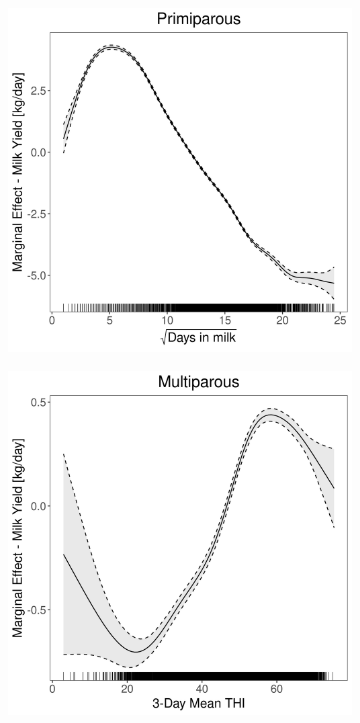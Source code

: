 \begin{figure}[H]
\begin{subfigure}[b]{0.45\textwidth}
    \end{subfigure}
    \hspace{0.05\textwidth} %
    \begin{subfigure}[b]{0.45\textwidth}
        \centering
        \includegraphics[width=\textwidth]{thesis/figures/models/milk/before2010/je_milk_before2010/je_milk_before2010_marginal_dim_milk_primi.png}
    \end{subfigure}
    \begin{subfigure}[b]{0.45\textwidth}
        \centering
        \includegraphics[width=\textwidth]{thesis/figures/models/milk/before2010/je_milk_before2010/je_milk_before2010_marginal_thi_milk_multi.png}

\end{subfigure}
\end{figure}
